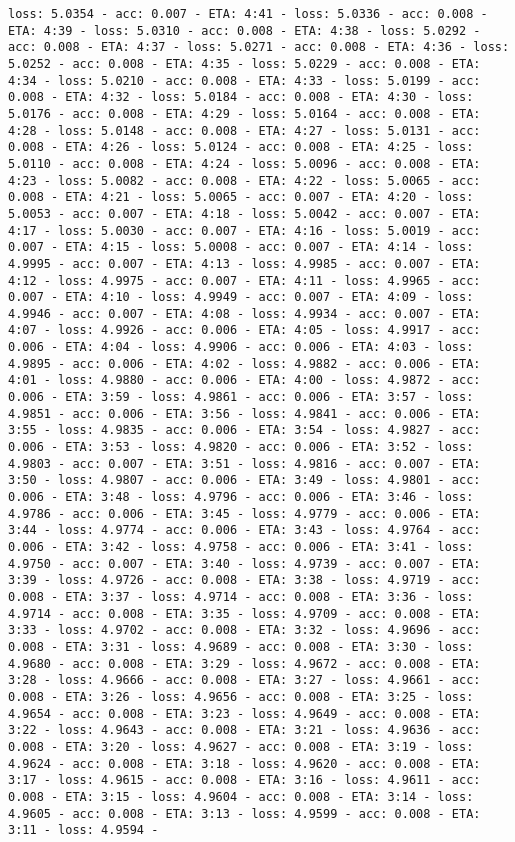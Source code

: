 \documentclass[11pt]{article}
\begin{document}
\begin{Verbatim}[commandchars=\\\{\}]
loss: 5.0354 - acc: 0.007 - ETA: 4:41 - loss: 5.0336 - acc: 0.008 - ETA: 4:39 - loss: 5.0310 - acc: 0.008 - ETA: 4:38 - loss: 5.0292 - acc: 0.008 - ETA: 4:37 - loss: 5.0271 - acc: 0.008 - ETA: 4:36 - loss: 5.0252 - acc: 0.008 - ETA: 4:35 - loss: 5.0229 - acc: 0.008 - ETA: 4:34 - loss: 5.0210 - acc: 0.008 - ETA: 4:33 - loss: 5.0199 - acc: 0.008 - ETA: 4:32 - loss: 5.0184 - acc: 0.008 - ETA: 4:30 - loss: 5.0176 - acc: 0.008 - ETA: 4:29 - loss: 5.0164 - acc: 0.008 - ETA: 4:28 - loss: 5.0148 - acc: 0.008 - ETA: 4:27 - loss: 5.0131 - acc: 0.008 - ETA: 4:26 - loss: 5.0124 - acc: 0.008 - ETA: 4:25 - loss: 5.0110 - acc: 0.008 - ETA: 4:24 - loss: 5.0096 - acc: 0.008 - ETA: 4:23 - loss: 5.0082 - acc: 0.008 - ETA: 4:22 - loss: 5.0065 - acc: 0.008 - ETA: 4:21 - loss: 5.0065 - acc: 0.007 - ETA: 4:20 - loss: 5.0053 - acc: 0.007 - ETA: 4:18 - loss: 5.0042 - acc: 0.007 - ETA: 4:17 - loss: 5.0030 - acc: 0.007 - ETA: 4:16 - loss: 5.0019 - acc: 0.007 - ETA: 4:15 - loss: 5.0008 - acc: 0.007 - ETA: 4:14 - loss: 4.9995 - acc: 0.007 - ETA: 4:13 - loss: 4.9985 - acc: 0.007 - ETA: 4:12 - loss: 4.9975 - acc: 0.007 - ETA: 4:11 - loss: 4.9965 - acc: 0.007 - ETA: 4:10 - loss: 4.9949 - acc: 0.007 - ETA: 4:09 - loss: 4.9946 - acc: 0.007 - ETA: 4:08 - loss: 4.9934 - acc: 0.007 - ETA: 4:07 - loss: 4.9926 - acc: 0.006 - ETA: 4:05 - loss: 4.9917 - acc: 0.006 - ETA: 4:04 - loss: 4.9906 - acc: 0.006 - ETA: 4:03 - loss: 4.9895 - acc: 0.006 - ETA: 4:02 - loss: 4.9882 - acc: 0.006 - ETA: 4:01 - loss: 4.9880 - acc: 0.006 - ETA: 4:00 - loss: 4.9872 - acc: 0.006 - ETA: 3:59 - loss: 4.9861 - acc: 0.006 - ETA: 3:57 - loss: 4.9851 - acc: 0.006 - ETA: 3:56 - loss: 4.9841 - acc: 0.006 - ETA: 3:55 - loss: 4.9835 - acc: 0.006 - ETA: 3:54 - loss: 4.9827 - acc: 0.006 - ETA: 3:53 - loss: 4.9820 - acc: 0.006 - ETA: 3:52 - loss: 4.9803 - acc: 0.007 - ETA: 3:51 - loss: 4.9816 - acc: 0.007 - ETA: 3:50 - loss: 4.9807 - acc: 0.006 - ETA: 3:49 - loss: 4.9801 - acc: 0.006 - ETA: 3:48 - loss: 4.9796 - acc: 0.006 - ETA: 3:46 - loss: 4.9786 - acc: 0.006 - ETA: 3:45 - loss: 4.9779 - acc: 0.006 - ETA: 3:44 - loss: 4.9774 - acc: 0.006 - ETA: 3:43 - loss: 4.9764 - acc: 0.006 - ETA: 3:42 - loss: 4.9758 - acc: 0.006 - ETA: 3:41 - loss: 4.9750 - acc: 0.007 - ETA: 3:40 - loss: 4.9739 - acc: 0.007 - ETA: 3:39 - loss: 4.9726 - acc: 0.008 - ETA: 3:38 - loss: 4.9719 - acc: 0.008 - ETA: 3:37 - loss: 4.9714 - acc: 0.008 - ETA: 3:36 - loss: 4.9714 - acc: 0.008 - ETA: 3:35 - loss: 4.9709 - acc: 0.008 - ETA: 3:33 - loss: 4.9702 - acc: 0.008 - ETA: 3:32 - loss: 4.9696 - acc: 0.008 - ETA: 3:31 - loss: 4.9689 - acc: 0.008 - ETA: 3:30 - loss: 4.9680 - acc: 0.008 - ETA: 3:29 - loss: 4.9672 - acc: 0.008 - ETA: 3:28 - loss: 4.9666 - acc: 0.008 - ETA: 3:27 - loss: 4.9661 - acc: 0.008 - ETA: 3:26 - loss: 4.9656 - acc: 0.008 - ETA: 3:25 - loss: 4.9654 - acc: 0.008 - ETA: 3:23 - loss: 4.9649 - acc: 0.008 - ETA: 3:22 - loss: 4.9643 - acc: 0.008 - ETA: 3:21 - loss: 4.9636 - acc: 0.008 - ETA: 3:20 - loss: 4.9627 - acc: 0.008 - ETA: 3:19 - loss: 4.9624 - acc: 0.008 - ETA: 3:18 - loss: 4.9620 - acc: 0.008 - ETA: 3:17 - loss: 4.9615 - acc: 0.008 - ETA: 3:16 - loss: 4.9611 - acc: 0.008 - ETA: 3:15 - loss: 4.9604 - acc: 0.008 - ETA: 3:14 - loss: 4.9605 - acc: 0.008 - ETA: 3:13 - loss: 4.9599 - acc: 0.008 - ETA: 3:11 - loss: 4.9594 - 
\end{Verbatim}
\end{document}
